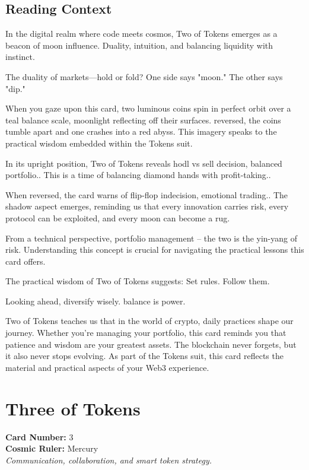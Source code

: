 \documentclass[11pt,oneside]{book}
\begin{document}
\begin{minipage}[t]{0.55\textwidth}
  \subsection*{Reading Context}
  In the digital realm where code meets cosmos, Two of Tokens emerges as a beacon of moon influence. Duality, intuition, and balancing liquidity with instinct.

  The duality of markets—hold or fold? One side says "moon." The other says "dip."

  When you gaze upon this card, two luminous coins spin in perfect orbit over a teal balance scale, moonlight reflecting off their surfaces. reversed, the coins tumble apart and one crashes into a red abyss. This imagery speaks to the practical wisdom embedded within the Tokens suit.

  In its upright position, Two of Tokens reveals hodl vs sell decision, balanced portfolio.. This is a time of balancing diamond hands with profit-taking..

  When reversed, the card warns of flip-flop indecision, emotional trading.. The shadow aspect emerges, reminding us that every innovation carries risk, every protocol can be exploited, and every moon can become a rug.

  From a technical perspective, portfolio management – the two is the yin-yang of risk. Understanding this concept is crucial for navigating the practical lessons this card offers.

  The practical wisdom of Two of Tokens suggests: Set rules. Follow them.

  Looking ahead, diversify wisely. balance is power.

  Two of Tokens teaches us that in the world of crypto, daily practices shape our journey. Whether you're managing your portfolio, this card reminds you that patience and wisdom are your greatest assets. The blockchain never forgets, but it also never stops evolving. As part of the Tokens suit, this card reflects the material and practical aspects of your Web3 experience.

\end{minipage}

\newpage
\section*{Three of Tokens}

\begin{minipage}[t]{0.55\textwidth}
  \vspace{0pt}
  \textbf{Card Number:} 3\\  \textbf{Cosmic Ruler:} Mercury\\  \textit{Communication, collaboration, and smart token strategy.}
\end{minipage}
\end{document}
